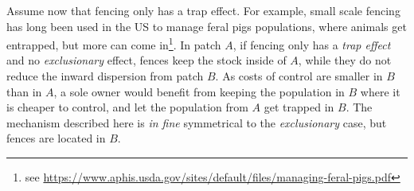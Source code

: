 Assume now that fencing only has a trap effect. For example, small scale fencing has long been used in the US to manage feral pigs populations, where animals get entrapped, but more can come in\footnote{see \url{https://www.aphis.usda.gov/sites/default/files/managing-feral-pigs.pdf}}. In patch $A$, if fencing only has a \textit{trap effect} and no \textit{exclusionary} effect, fences keep the stock inside of $A$, while they do not reduce the inward dispersion from patch $B$. As costs of control are smaller in $B$ than in $A$, a sole owner would benefit from keeping the population in $B$ where it is cheaper to control, and let the population from $A$ get trapped in $B$. The mechanism described here is \textit{in fine} symmetrical to the \textit{exclusionary} case, but fences are located in $B$.


